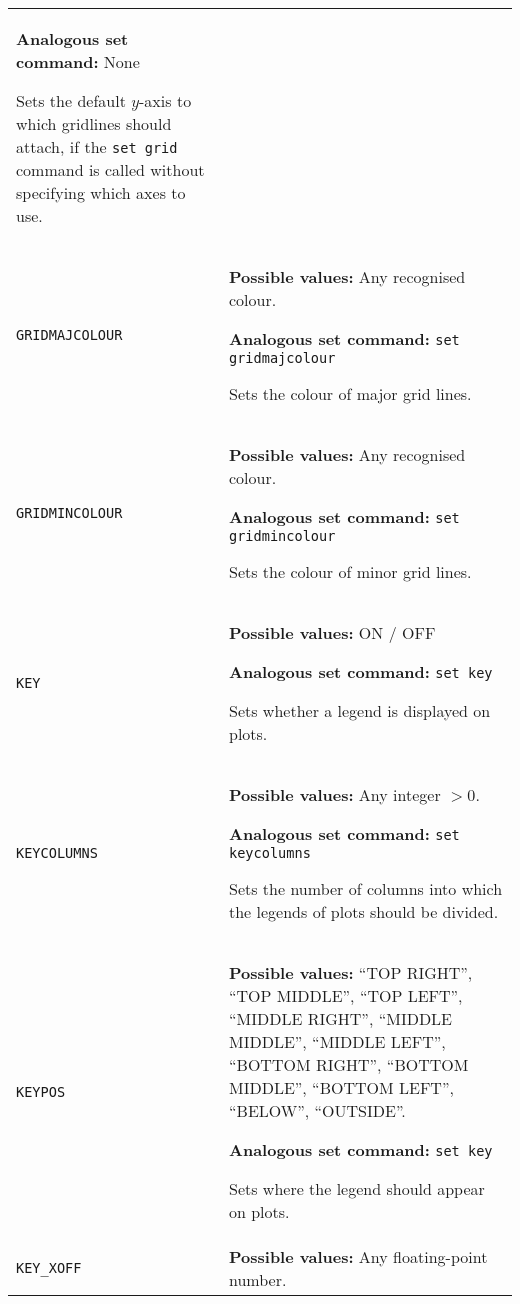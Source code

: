 \documentclass[a4paper,onecolumn,11pt]{book}
\begin{document}
\begin{longtable}{p{3.4cm}p{9cm}}
                   \textbf{Analogous set command:} None

                   Sets the default $y$-axis to which gridlines should attach, if the \texttt{set grid} command is called without specifying which axes to use.
                   \\
\texttt{GRIDMAJCOLOUR} & \textbf{Possible values:} Any recognised colour.

                   \textbf{Analogous set command:} \texttt{set gridmajcolour}\index{set gridmajcolour command@\texttt{set gridmajcolour} command}

                   Sets the colour of major grid lines.
                   \\
\texttt{GRIDMINCOLOUR} & \textbf{Possible values:} Any recognised colour.

                   \textbf{Analogous set command:} \texttt{set gridmincolour}\index{set gridmincolour command@\texttt{set gridmincolour} command}

                   Sets the colour of minor grid lines.
                   \\
\texttt{KEY} & \textbf{Possible values:} ON / OFF

                   \textbf{Analogous set command:} \texttt{set key}\index{set key command@\texttt{set key} command}

                   Sets whether a legend is displayed on plots.
                   \\
\texttt{KEYCOLUMNS} & \textbf{Possible values:} Any integer $>0$.

                   \textbf{Analogous set command:} \texttt{set keycolumns}\index{set keycolumnscommand@\texttt{set keycolumns} command}

                   Sets the number of columns into which the legends of plots should be divided.
                   \\
\texttt{KEYPOS} & \textbf{Possible values:} ``TOP RIGHT'', ``TOP MIDDLE'', ``TOP LEFT'', ``MIDDLE RIGHT'', ``MIDDLE MIDDLE'', ``MIDDLE LEFT'', ``BOTTOM RIGHT'', ``BOTTOM MIDDLE'', ``BOTTOM LEFT'', ``BELOW'', ``OUTSIDE''.

                   \textbf{Analogous set command:} \texttt{set key}\index{set key command@\texttt{set key} command}

                   Sets where the legend should appear on plots.
                   \\
\texttt{KEY\_XOFF} & \textbf{Possible values:} Any floating-point number.


\end{longtable}
\end{document}
